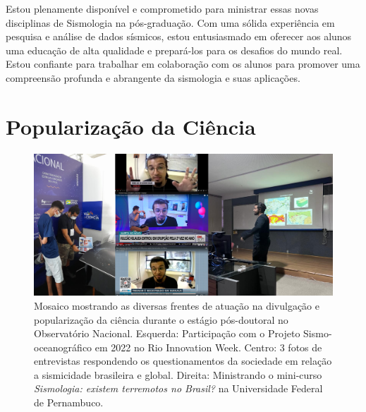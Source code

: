 \documentclass[10pt,a4paper,oneside]{book}
\newcommand{\HeroFigPad}{\vspace{-1cm}}
\begin{document}
Estou plenamente disponível e comprometido para ministrar essas novas disciplinas de Sismologia na pós-graduação. Com uma sólida experiência em pesquisa e análise de dados sísmicos, estou entusiasmado em oferecer aos alunos uma educação de alta qualidade e prepará-los para os desafios do mundo real. Estou confiante para trabalhar em colaboração com os alunos para promover uma compreensão profunda e abrangente da sismologia e suas aplicações.



\chapter{Popularização da Ciência}
\label{cap_comunidade}

\bigskip

\begin{figure}[h]
  \HeroFigPad
  \begin{center}
    \includegraphics[width=\textwidth]{images/atuacao_divulga.png}
  \end{center}
  \caption{
    Mosaico mostrando as diversas frentes de atuação na divulgação e popularização da ciência durante o estágio pós-doutoral no Observatório Nacional. Esquerda: Participação com o Projeto Sismo-oceanográfico em 2022 no Rio Innovation Week. Centro: 3 fotos de entrevistas respondendo os questionamentos da sociedade em relação a sismicidade brasileira e global. Direita: Ministrando o mini-curso \textit{Sismologia: existem terremotos no Brasil?} na Universidade Federal de Pernambuco.}
\end{figure}
\end{document}
